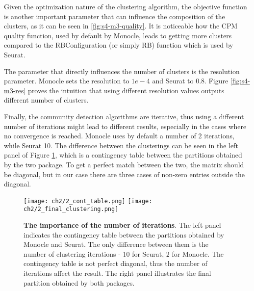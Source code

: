 Given the optimization nature of the clustering algorithm, the objective function is another important parameter that can influence the composition of the clusters, as it can be seen in \ref{fig:s4-m3-quality}. It is noticeable how the CPM quality function, used by default by Monocle, leads to getting more clusters compared to the RBConfiguration (or simply RB) function which is used by Seurat.

The parameter that directly influences the number of clusters is the resolution parameter. Monocle sets the resolution to $1e-4$ and Seurat to $0.8$. Figure \ref{fig:s4-m3-res} proves the intuition that using different resolution values outputs different number of clusters.

Finally, the community detection algorithms are iterative, thus using a different number of iterations might lead to different results, especially in the cases where no convergence is reached. Monocle uses by default a number of 2 iterations, while Seurat 10. The difference between the clusterings can be seen in the left panel of Figure \ref{fig:s4-m3-cont}, which is a contingency table between the partitions obtained by the two package. To get a perfect match between the two, the matrix should be diagonal, but in our case there are three cases of non-zero entries outside the diagonal.
\begin{figure}[H]
    \centering
    \texttt{[image: ch2/2\_cont\_table.png]}
    \texttt{[image: ch2/2\_final\_clustering.png]}
    \caption{\label{fig:s4-m3-cont}\textbf{The importance of the number of iterations}. The left panel indicates the contingency table between the partitions obtained by Monocle and Seurat. The only difference between them is the number of clustering iterations - 10 for Seurat, 2 for Monocle. The contingency table is not perfect diagonal, thus the number of iterations affect the result. The right panel illustrates the final partition obtained by both packages.}
\end{figure}

